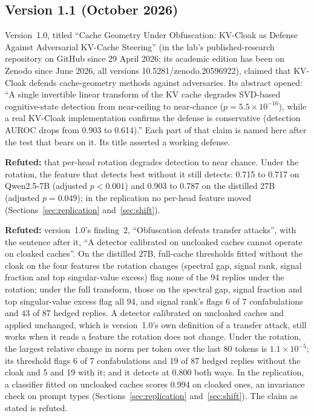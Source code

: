 \documentclass[11pt,a4paper]{article}
\begin{document}
\subsection{Version 1.1 (October 2026)}
\label{app:v11}

Version~1.0, titled ``Cache Geometry Under Obfuscation: KV-Cloak as
Defense Against Adversarial KV-Cache Steering'' (in the lab's
published-research repository on GitHub since 29 April 2026; its academic
edition has been on Zenodo since June 2026, all versions
10.5281/zenodo.20596922), claimed that KV-Cloak defends cache-geometry
methods against adversaries. Its abstract opened: ``A single invertible
linear transform of the KV cache degrades SVD-based cognitive-state
detection from near-ceiling to near-chance ($p = 5.5 \times 10^{-16}$),
while a real KV-Cloak implementation confirms the defense is conservative
(detection AUROC drops from 0.903 to 0.614).'' Each part of that claim is
named here after the test that bears on it. Its title asserted a working
defense.

\textbf{Refuted:} that per-head rotation degrades detection to near
chance. Under the rotation, the feature that detects best without it still
detects: 0.715 to 0.717 on Qwen2.5-7B (adjusted $p < 0.001$) and 0.903 to
0.787 on the distilled 27B (adjusted $p = 0.049$); in the replication no
per-head feature moved (Sections~\ref{sec:replication}
and~\ref{sec:shift}).

\textbf{Refuted:} version~1.0's finding~2, ``Obfuscation defeats
transfer attacks'', with the sentence after it, ``A detector calibrated
on uncloaked caches cannot operate on cloaked caches''. On the distilled
27B, full-cache thresholds fitted without the cloak on the four features
the rotation changes (spectral gap, signal rank, signal fraction and top
singular-value excess) flag none of the 94 replies under the rotation;
under the full transform, those on the spectral gap, signal fraction and
top singular-value excess flag all 94, and signal rank's flags 6 of 7
confabulations and 43 of 87 hedged replies. A detector calibrated on
uncloaked caches and applied unchanged, which is version~1.0's own
definition of a transfer attack, still works when it reads a feature the
rotation does not change. Under the rotation, the largest relative change
in norm per token over the last 80 tokens is $1.1 \times 10^{-5}$; its
threshold flags 6 of 7 confabulations and 19 of 87 hedged replies
without the cloak and 5 and 19 with it; and it detects at 0.800 both
ways. In the replication, a classifier fitted on uncloaked caches scores
0.994 on cloaked ones, an invariance check on prompt types
(Sections~\ref{sec:replication} and~\ref{sec:shift}). The claim as stated
is refuted.
\end{document}
